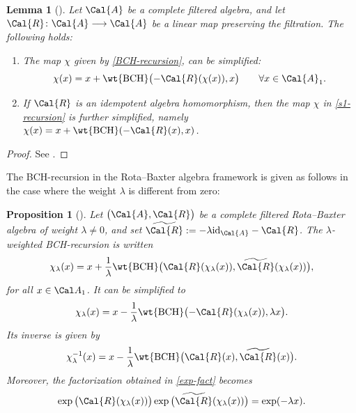 \documentclass[10pt,a4paper]{amsart}
\numberwithin{equation}{section}
\newtheorem{Lemma}[Theorem]{Lemma}
\newtheorem{Proposition}[Theorem]{Proposition}
 { \theoremstyle{definition}
\newtheorem{Definition}[Theorem]{Definition}
\newtheorem{Note}[Theorem]{Note}
\newtheorem{Example}[Theorem]{Example}
\newtheorem{Remark}[Theorem]{Remark} }
\begin{document}
\begin{Lemma}[\cite{KLM06}]
Let $\Cal{A}$ be a complete filtered algebra, and let $\Cal{R}\colon \Cal{A} \longrightarrow \Cal{A}$ be a linear map preserving the filtration. The following holds:
\begin{enumerate}\itemsep=0pt
\item[$1.$] The map $\chi$ given by \eqref{BCH-recursion}, can be simplified:
\begin{equation}\label{s1-recursion}
\chi(x) = x + \wt{{\rm BCH}}\big({-}\Cal{R}(\chi(x)), x \big) \qquad \forall x \in \Cal{A}_1.
\end{equation}
\item[$2.$] If $\Cal{R}$ is an idempotent algebra homomorphism, then the map $\chi$ in \eqref{s1-recursion} is further simplified, namely $\chi(x) = x + \wt{{\rm BCH}}(-\Cal{R}(x), x)$.
\end{enumerate}
\end{Lemma}

\begin{proof}
See \cite[Lemmas 6 and 7]{KLM06}.
\end{proof}

The BCH-recursion in the Rota--Baxter algebra framework is given as follows in the case where the weight $\lambda$ is different from zero:

\begin{Proposition}[{\cite[Proposition 11]{KLM06}}]
Let $\big(\Cal{A}, \Cal{R}\big)$ be a complete filtered Rota--Baxter algebra of weight $\lambda\neq 0$, and set $\widetilde{\Cal{R}} := -\lambda {\rm id}_{\Cal{A}}- \Cal{R}$. The $\lambda$-weighted BCH-recursion is written
\begin{equation}
\label{chi-lambda-rec}
\chi_{\lambda}(x)
= x + \frac{1}{\lambda} \wt{{\rm BCH}}\big(\Cal{R}(\chi_{\lambda}(x)),
\widetilde{\Cal{R}}(\chi_{\lambda}(x))\big),
\end{equation}
for all $x\in\Cal A_1$. It can be simplified to
\begin{equation*}
\chi_{\lambda}(x)
= x - \frac{1}{\lambda} \wt{{\rm BCH}}\big({-}\Cal{R}(\chi_{\lambda}(x)), \lambda x\big).
\end{equation*}
Its inverse is given by
\begin{equation*}
\chi_{\lambda}^{-1}(x)
= x - \frac{1}{\lambda} \wt{{\rm BCH}}\big(\Cal{R}(x), \widetilde{\Cal{R}}(x)\big).
\end{equation*}
Moreover, the factorization obtained in \eqref{exp-fact} becomes
\begin{equation}
\label{exp-moins-lambda-x}
\exp\big(\Cal{R}(\chi_{\lambda}(x))\big)\exp\big(\widetilde{\Cal{R}}
(\chi_{\lambda}(x))\big) = \exp(-\lambda x).
\end{equation}
\end{Proposition}
\end{document}
